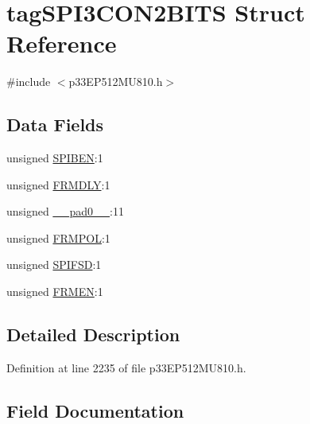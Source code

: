 \hypertarget{structtag_s_p_i3_c_o_n2_b_i_t_s}{}\section{tag\+S\+P\+I3\+C\+O\+N2\+B\+I\+TS Struct Reference}
\label{structtag_s_p_i3_c_o_n2_b_i_t_s}


{\ttfamily \#include $<$p33\+E\+P512\+M\+U810.\+h$>$}

\subsection*{Data Fields}
\begin{DoxyCompactItemize}
\item 
unsigned \hyperlink{structtag_s_p_i3_c_o_n2_b_i_t_s_a48f1b49d7589da2ee8c38cd6d820a542}{S\+P\+I\+B\+EN}\+:1
\item 
unsigned \hyperlink{structtag_s_p_i3_c_o_n2_b_i_t_s_abc2e71af924cda26b91c8945dc68c1d4}{F\+R\+M\+D\+LY}\+:1
\item 
unsigned \hyperlink{structtag_s_p_i3_c_o_n2_b_i_t_s_adf71f3d8410c1f1dbbc96680a92c49af}{\+\_\+\+\_\+pad0\+\_\+\+\_\+}\+:11
\item 
unsigned \hyperlink{structtag_s_p_i3_c_o_n2_b_i_t_s_a3f77b33ab0ae8182d247d8a75ce9795f}{F\+R\+M\+P\+OL}\+:1
\item 
unsigned \hyperlink{structtag_s_p_i3_c_o_n2_b_i_t_s_aeb3b552a9f7c25bc1ae09655904e34cc}{S\+P\+I\+F\+SD}\+:1
\item 
unsigned \hyperlink{structtag_s_p_i3_c_o_n2_b_i_t_s_a312bafba1b24944c8dfc39323e8fd4e9}{F\+R\+M\+EN}\+:1
\end{DoxyCompactItemize}


\subsection{Detailed Description}


Definition at line 2235 of file p33\+E\+P512\+M\+U810.\+h.



\subsection{Field Documentation}
\mbox{\label{structtag_s_p_i3_c_o_n2_b_i_t_s_adf71f3d8410c1f1dbbc96680a92c49af}} 
